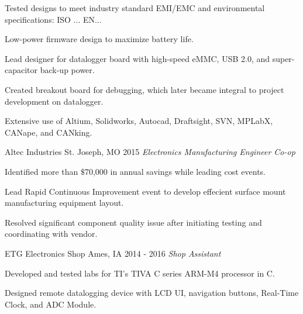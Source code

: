 \documentclass[]{bergman-cv} %
\begin{document}
\begin{entrylist}
{\begin{itemizenosep}
	\item Tested designs to meet industry standard EMI/EMC and environmental specifications: ISO ... EN...
	\item Low-power firmware design to maximize battery life.
	\item Lead designer for datalogger board with high-speed eMMC, USB 2.0, and super-capacitor back-up power.
	\item Created breakout board for debugging, which later became integral to project development on datalogger.
	\item Extensive use of Altium, Solidworks, Autocad, Draftsight, SVN, MPLabX, CANape, and CANking.
\end{itemizenosep}}
\entry
{Altec Industries}
{St. Joseph, MO}
{2015}
{\emph{Electronics Manufacturing Engineer Co-op}}
{\begin{itemizenosep}
	\item Identified more than $\$$70,000 in annual savings while leading cost events.
	\item Lead Rapid Continuous Improvement event to develop effecient surface mount manufacturing equipment layout.
	\item Resolved significant component quality issue after initiating testing and coordinating with vendor.
\end{itemizenosep}}
\entry
{ETG Electronics Shop}
{Ames, IA}
{2014 - 2016}
{\emph{Shop Assistant}}
{\begin{itemizenosep}
	\item Developed and tested labs for TI's TIVA C series ARM-M4 processor in C.
	\item Designed remote datalogging device with LCD UI, navigation buttons, Real-Time Clock, and ADC Module.
\end{itemizenosep}}

\end{entrylist}
\end{document}
